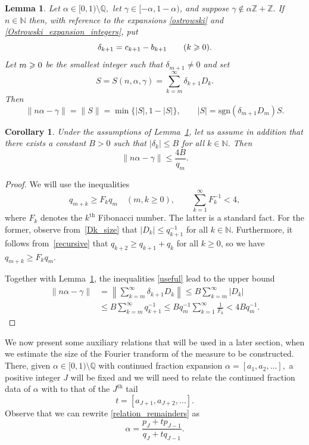 \documentclass[12pt, reqno]{amsart}
\newtheorem{lemma}[thm]{Lemma}
\newtheorem{cor}[thm]{Corollary}
\theoremstyle{definition}
\theoremstyle{remark}
\numberwithin{equation}{section}
\def\alp{{\alpha}} \def\bfalp{{\boldsymbol \alpha}}
\def\gam{{\gamma}} \def\Gam{{\Gamma}}
\def\del{{\delta}} \def\Del{{\Delta}}
\def\leq{\leqslant}
\def\geq{\geqslant}
\def \bN {\mathbb N}
\def \bQ {\mathbb Q}
\def \bZ {\mathbb Z}
\begin{document}
	\begin{lemma}\label{nag} Let $\alp \in [0,1)\setminus \bQ,$ let $\gam\in[-\alp,1-\alp)$, and suppose $\gam\notin \alp\bZ + \bZ.$ If $n\in\bN$ then, with reference to the expansions \eqref{ostrowski} and \eqref{Ostrowski_expansion_integers}, put
		\begin{equation} \label{delta_k_def}
			\del_{k+1} = c_{k+1} - b_{k+1} \qquad (k \gs 0).
		\end{equation}
		Let $m\geqslant 0$ be the smallest integer such that $\delta_{m+1}\neq 0$ and set 
		\[ S = S(n,\alp,\gam) = \sum_{k=m}^{\infty}\delta_{k+1}D_k.  \]
		Then 
		\[
		\|n\alp -\gam\| = \|S\| 
		= \min\{|S|, 1-|S|\}, \qquad 
		|S| = \mathrm{sgn}(\delta_{m+1}D_m)S.
		\]
	\end{lemma}
	
	\begin{cor} \label{cor_nag}
		Under the assumptions of Lemma~\ref{nag}, let us assume in addition that there exists a constant $B>0$ such that $|\delta_k|\leq B$ for all $k\in\bN$. Then
		\[
		\|n\alp-\gam\|\leq \frac{4 B}{q_m}.
		\]
	\end{cor}
	
	\begin{proof} We will use the inequalities
		\begin{equation} \label{useful}
			q_{m+k} \ge F_k q_m \quad (m, k \ge 0),
			\qquad \sum_{k=1}^\infty F_k^{-1} < 4,
		\end{equation}
		where $F_k$ denotes the $k^{\mathrm{th}}$ Fibonacci number.
		The latter is a standard fact. For the former, observe from~\eqref{Dk_size} that $|D_k|\leq q_{k+1}^{-1}$ for all $k\in\bN$. Furthermore, it follows from~\eqref{recursive} that $q_{k+2}\geq q_{k+1}+q_k$ for all $k \ge 0$, so we have $q_{m+k} \ge F_k q_m$.  
		
		Together with Lemma~\ref{nag}, the inequalities \eqref{useful} lead to the upper bound
		\[ \begin{aligned}
			\|n\alp-\gam\| & = \left\|\sum_{k=m}^{\infty}\delta_{k+1}D_k\right\|\leq B\sum_{k=m}^{\infty}|D_k|\\
			&\leq B\sum_{k=m}^{\infty}q_{k+1}^{-1}\leq Bq_m^{-1}\sum_{k=1}^{\infty}\frac{1}{F_k}
			< 4Bq_m^{-1}.
		\end{aligned}
		\]
	\end{proof}
	
	We now present some auxiliary relations that will be used in a later section, when we estimate the size of the Fourier transform of the measure to be constructed. There, given $\alp \in [0,1)\setminus \bQ $ with continued fraction expansion $\alp = [a_1, a_2, \ldots],$ a positive integer $J$ will be fixed and we will need to relate the continued fraction data of $\alp$ with to that of the $J^{\mathrm{th}}$ tail 
	\[ t = 
	[a_{J+1}, a_{J+2}, \ldots]. 
	\] 
	Observe that we can rewrite \eqref{relation_remainders} as
	\begin{equation}
		\alp = \frac{p_J + t p_{J-1}} {q_J + tq_{J-1}}\label{alphaoft}. 
	\end{equation}
	
\end{document}
